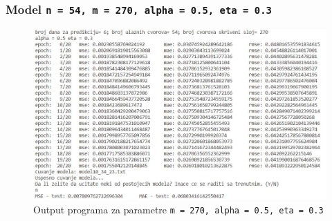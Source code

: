 \documentclass[a4paper]{article}
\begin{document}
\subsubsection{Model \texttt{n = 54, m = 270, alpha = 0.5, eta = 0.3}}
\begin{figure}[h!]
\begin{center}
\includegraphics[scale=0.9]{output/output_example_program_10_34_23.JPG}
\end{center}
\caption{Output programa za parametre \texttt{m = 270, alpha = 0.5, eta = 0.3}}
\end{figure}
\end{document}
